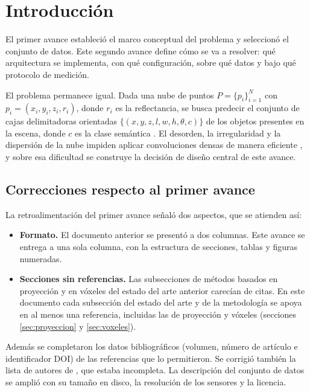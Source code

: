 \documentclass[11pt,letterpaper]{article}
\begin{document}
\section{Introducción}

El primer avance estableció el marco conceptual del problema y seleccionó el conjunto de datos. Este segundo avance define cómo se va a resolver: qué arquitectura se implementa, con qué configuración, sobre qué datos y bajo qué protocolo de medición.

El problema permanece igual. Dada una nube de puntos $P = \{p_i\}_{i=1}^{N}$ con $p_i = (x_i, y_i, z_i, r_i)$, donde $r_i$ es la reflectancia, se busca predecir el conjunto de cajas delimitadoras orientadas $\{(x, y, z, l, w, h, \theta, c)\}$ de los objetos presentes en la escena, donde $c$ es la clase semántica \cite{geiger2013}. El desorden, la irregularidad y la dispersión de la nube impiden aplicar convoluciones densas de manera eficiente \cite{guo2021, li2021}, y sobre esa dificultad se construye la decisión de diseño central de este avance.

\subsection{Correcciones respecto al primer avance}

La retroalimentación del primer avance señaló dos aspectos, que se atienden así:

\begin{itemize}
\item \textbf{Formato.} El documento anterior se presentó a dos columnas. Este avance se entrega a una sola columna, con la estructura de secciones, tablas y figuras numeradas.
\item \textbf{Secciones sin referencias.} Las subsecciones de métodos basados en proyección y en vóxeles del estado del arte anterior carecían de citas. En este documento cada subsección del estado del arte y de la metodología se apoya en al menos una referencia, incluidas las de proyección y vóxeles (secciones \ref{sec:proyeccion} y \ref{sec:voxeles}).
\end{itemize}

Además se completaron los datos bibliográficos (volumen, número de artículo e identificador DOI) de las referencias que lo permitieron. Se corrigió también la lista de autores de \cite{qi2024}, que estaba incompleta. La descripción del conjunto de datos se amplió con su tamaño en disco, la resolución de los sensores y la licencia.
\end{document}
